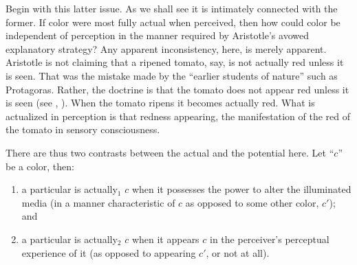 Begin with this latter issue. As we shall see it is intimately connected with the former. If color were most fully actual when perceived, then how could color be independent of perception in the manner required by Aristotle's avowed explanatory strategy? Any apparent inconsistency, here, is merely apparent. Aristotle is not claiming that a ripened tomato, say, is not actually red unless it is seen. That was the mistake made by the ``earlier students of nature'' such as Protagoras. Rather, the doctrine is that the tomato does not appear red unless it is seen (see \citealt[29]{Burnyeat:1982mz}, \citealt{Ganson:1997fk}). When the tomato ripens it becomes actually red. What is actualized in perception is that redness appearing, the manifestation of the red of the tomato in sensory consciousness. 

There are thus two contrasts between the actual and the potential here. Let ``\( c \)'' be a color, then:
\begin{enumerate}[(1)]
	\item a particular is actually\( _{1} \) \( c \) when it possesses the power to alter the illuminated media (in a manner characteristic of \( c \) as opposed to some other color, \( c' \)); and
	\item a particular is actually\( _{2} \) \( c \) when it appears \( c \) in the perceiver's perceptual experience of it (as opposed to appearing \( c' \), or not at all).
\end{enumerate}

